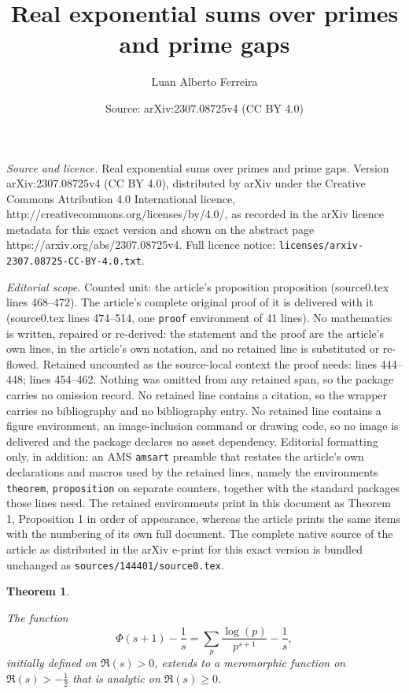 \documentclass[10pt,a4paper]{amsart}
\title{Real exponential sums over primes and prime gaps}
\author{Luan Alberto Ferreira}
\date{Source: arXiv:2307.08725v4 (CC BY 4.0)}
\newtheorem{theorem}{Theorem}
\newcommand{\difrac}{\displaystyle \frac}
\newcommand{\disum}{\displaystyle \sum}
\begin{document}
\maketitle

\noindent\emph{Source and licence.} Real exponential sums over primes and prime gaps. Version arXiv:2307.08725v4 (CC BY 4.0), distributed by arXiv under the Creative Commons Attribution 4.0 International licence, http://creativecommons.org/licenses/by/4.0/, as recorded in the arXiv licence metadata for this exact version and shown on the abstract page https://arxiv.org/abs/2307.08725v4. Full licence notice: \texttt{licenses/arxiv-2307.08725-CC-BY-4.0.txt}.\par\smallskip

\noindent\textit{Editorial scope.} Counted unit: the article's proposition proposition (source0.tex lines 468--472). The article's complete original proof of it is delivered with it (source0.tex lines 474--514, one \texttt{proof} environment of 41 lines). No mathematics is written, repaired or re-derived: the statement and the proof are the article's own lines, in the article's own notation, and no retained line is substituted or re-flowed.  Retained uncounted as the source-local context the proof needs: lines 444--448; lines 454--462.  Nothing was omitted from any retained span, so the package carries no omission record.  No retained line contains a citation, so the wrapper carries no bibliography and no bibliography entry.  No retained line contains a figure environment, an image-inclusion command or drawing code, so no image is delivered and the package declares no asset dependency.  Editorial formatting only, in addition: an AMS \texttt{amsart} preamble that restates the article's own declarations and macros used by the retained lines, namely the environments \texttt{theorem}, \texttt{proposition} on separate counters, together with the standard packages those lines need.  The retained environments print in this document as Theorem 1, Proposition 1 in order of appearance, whereas the article prints the same items with the numbering of its own full document.  The complete native source of the article as distributed in the arXiv e-print for this exact version is bundled unchanged as \texttt{sources/144401/source0.tex}.
\begin{theorem} \label{wellknowntheorem}

The function $$\Phi(s + 1) - \difrac{1}{s} = \disum_p \difrac{\log(p)}{p^{s + 1}} - \difrac{1}{s},$$ initially defined on $\Re(s) > 0$, extends to a meromorphic function on $\Re(s) > -\difrac{1}{2}$ that is analytic on $\Re(s) \geq 0$.

\end{theorem}
\end{document}
